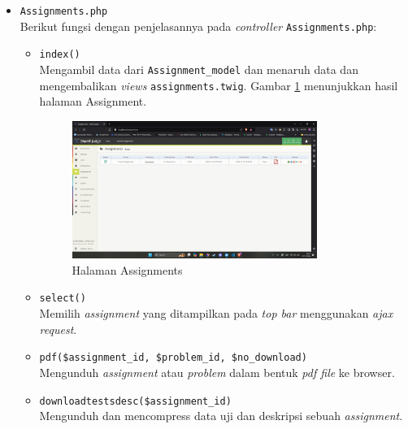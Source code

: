 \documentclass[a4paper,twoside]{article}
\begin{document}
\begin{enumerate}
\begin{itemize}
		            \begin{itemize}
			            \item \verb|Assignments.php| \\
			                  Berikut fungsi dengan penjelasannya pada \textit{controller} \verb|Assignments.php|:

			                  \begin{itemize}
				                  \item \verb|index()| \\
				                        Mengambil data dari \verb|Assignment_model| dan menaruh data dan mengembalikan \textit{views} \verb|assignments.twig|. Gambar \ref{fig:3:1:1:assignments} menunjukkan hasil halaman Assignment.

				                        \begin{figure}[H]
					                        \centering
					                        \includegraphics[width=0.8\textwidth]{views/assignments.png}
					                        \caption{Halaman Assignments}
					                        \label{fig:3:1:1:assignments}
				                        \end{figure}
				                  \item \verb|select()| \\
				                        Memilih \textit{assignment} yang ditampilkan pada \textit{top bar} menggunakan \textit{ajax request}.
				                  \item \verb|pdf($assignment_id, $problem_id, $no_download)| \\
				                        Mengunduh \textit{assignment} atau \textit{problem} dalam bentuk \textit{pdf file} ke browser.
				                  \item \verb|downloadtestsdesc($assignment_id)| \\
				                        Mengunduh dan mencompress data uji dan deskripsi sebuah \textit{assignment}.

\end{itemize}
\end{itemize}
\end{itemize}
\end{enumerate}
\end{document}
